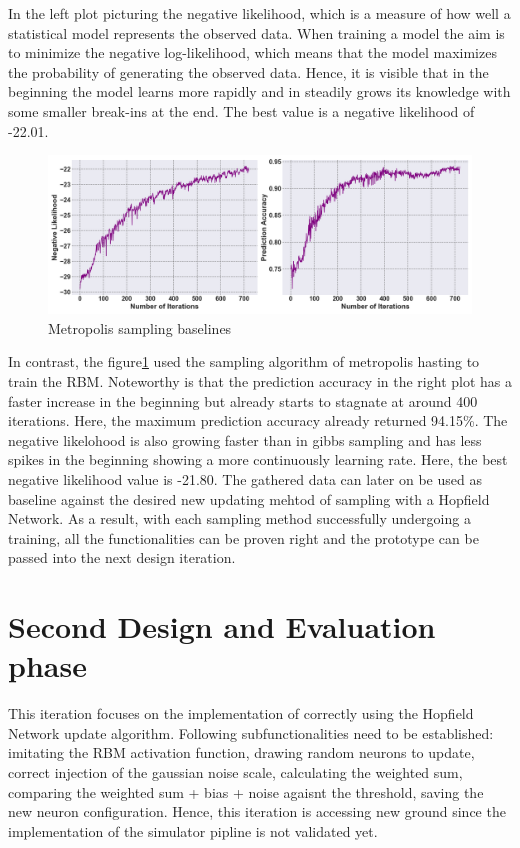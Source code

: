 In the left plot picturing the negative likelihood, which is a measure of how well a statistical model represents the observed data.
When training a model the aim is to minimize the negative log-likelihood, which means that the model maximizes the probability of generating the observed data.
Hence, it is visible that in the beginning the model learns more rapidly and in steadily grows its knowledge with some smaller break-ins at the end.
The best value is a negative likelihood of -22.01.
\begin{figure}[H]
    \centering
    \includegraphics[width=1\linewidth]{graphics/metropolis_combined_plot.png}
    \caption{Metropolis sampling baselines}
    \label{metropolis_baselines}
\end{figure}
In contrast, the figure\ref{metropolis_baselines} used the sampling algorithm of metropolis hasting to train the \ac{RBM}.
Noteworthy is that the prediction accuracy in the right plot has a faster increase in the beginning but already starts to stagnate at around 400 iterations. 
Here, the maximum prediction accuracy already returned 94.15\%. 
The negative likelohood is also growing faster than in gibbs sampling and has less spikes in the beginning showing a more continuously learning rate.
Here, the best negative likelihood value is -21.80.
The gathered data can later on be used as baseline against the desired new updating mehtod of sampling with a Hopfield Network.
As a result, with each sampling method successfully undergoing a training, all the functionalities can be proven right and the prototype can be passed 
into the next design iteration.


\section{Second Design and Evaluation phase}

This iteration focuses on the implementation of correctly using the Hopfield Network update algorithm. 
Following subfunctionalities need to be established: imitating the \ac{RBM} activation function, drawing random neurons to update,
correct injection of the gaussian noise scale, calculating the weighted sum,
comparing the weighted sum + bias + noise agaisnt the threshold,
saving the new neuron configuration.
Hence, this iteration is accessing new ground since the implementation of the simulator pipline is not validated yet. 

